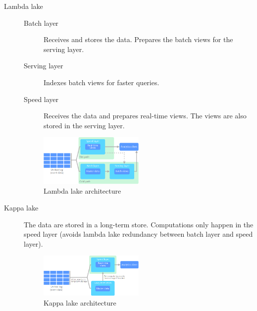 \begin{description}
    \item[Lambda lake] 
        \phantom{}
        \begin{description}
            \item[Batch layer] Receives and stores the data. Prepares the batch views for the serving layer.
            \item[Serving layer] Indexes batch views for faster queries.
            \item[Speed layer] Receives the data and prepares real-time views. The views are also stored in the serving layer.
        \end{description}
        \begin{figure}[ht]
            \centering
            \includegraphics[width=0.5\textwidth]{img/lambda_lake.png}
            \caption{Lambda lake architecture}
        \end{figure}

    \item[Kappa lake] 
        The data are stored in a long-term store.
        Computations only happen in the speed layer (avoids lambda lake redundancy between batch layer and speed layer).
        \begin{figure}[ht]
            \centering
            \includegraphics[width=0.5\textwidth]{img/kappa_lake.png}
            \caption{Kappa lake architecture}
        \end{figure}


\end{description}
